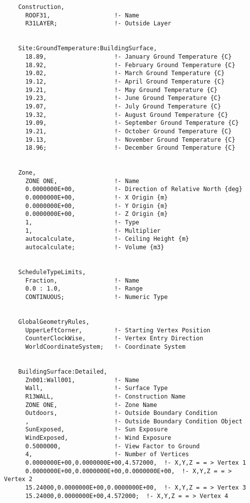 \begin{lstlisting}
    Construction,
      ROOF31,                  !- Name
      R31LAYER;                !- Outside Layer


    Site:GroundTemperature:BuildingSurface,
      18.89,                   !- January Ground Temperature {C}
      18.92,                   !- February Ground Temperature {C}
      19.02,                   !- March Ground Temperature {C}
      19.12,                   !- April Ground Temperature {C}
      19.21,                   !- May Ground Temperature {C}
      19.23,                   !- June Ground Temperature {C}
      19.07,                   !- July Ground Temperature {C}
      19.32,                   !- August Ground Temperature {C}
      19.09,                   !- September Ground Temperature {C}
      19.21,                   !- October Ground Temperature {C}
      19.13,                   !- November Ground Temperature {C}
      18.96;                   !- December Ground Temperature {C}


    Zone,
      ZONE ONE,                !- Name
      0.0000000E+00,           !- Direction of Relative North {deg}
      0.0000000E+00,           !- X Origin {m}
      0.0000000E+00,           !- Y Origin {m}
      0.0000000E+00,           !- Z Origin {m}
      1,                       !- Type
      1,                       !- Multiplier
      autocalculate,           !- Ceiling Height {m}
      autocalculate;           !- Volume {m3}


    ScheduleTypeLimits,
      Fraction,                !- Name
      0.0 : 1.0,               !- Range
      CONTINUOUS;              !- Numeric Type


    GlobalGeometryRules,
      UpperLeftCorner,         !- Starting Vertex Position
      CounterClockWise,        !- Vertex Entry Direction
      WorldCoordinateSystem;   !- Coordinate System


    BuildingSurface:Detailed,
      Zn001:Wall001,           !- Name
      Wall,                    !- Surface Type
      R13WALL,                 !- Construction Name
      ZONE ONE,                !- Zone Name
      Outdoors,                !- Outside Boundary Condition
      ,                        !- Outside Boundary Condition Object
      SunExposed,              !- Sun Exposure
      WindExposed,             !- Wind Exposure
      0.5000000,               !- View Factor to Ground
      4,                       !- Number of Vertices
      0.0000000E+00,0.0000000E+00,4.572000,  !- X,Y,Z = = > Vertex 1
      0.0000000E+00,0.0000000E+00,0.0000000E+00,  !- X,Y,Z = = > Vertex 2
      15.24000,0.0000000E+00,0.0000000E+00,  !- X,Y,Z = = > Vertex 3
      15.24000,0.0000000E+00,4.572000;  !- X,Y,Z = = > Vertex 4



\end{lstlisting}
